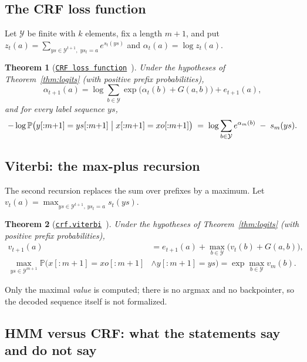 \documentclass[11pt,a4paper]{article}
\newcommand{\lmod}[2]{\href{http://www.lemma.cn/lean/?module=#2}{\nolinkurl{#1}}}
\newtheorem{theorem}{Theorem}[section]
\newcommand{\Prb}{\mathbb{P}}
\newcommand{\Y}{\mathcal{Y}}
\begin{document}
\subsection{The CRF loss function}
\label{sec:forward}
Let $\Y$ be finite with $k$ elements, fix a length $m+1$, and put $z_t(a)=\sum_{ys\in\Y^{t+1},\;ys_t=a}e^{s_t(ys)}$ and $\alpha_t(a)=\log z_t(a)$.

\begin{theorem}[\lmod{CRF loss function}{Random.All_Eq_AddLogSumExpAdd.All_EqNegLogProb.of.All_Eq_LogProbCond.All_Eq_LogProbCond.Eq_LogProbJoint.All_Lt0ProbJoint.IsDiscreteHMM}~\cite{lemma_crf_nll}]
\label{thm:nll}
Under the hypotheses of Theorem~\ref{thm:logits} (with positive prefix probabilities),
\[
\alpha_{t+1}(a)=\log\sum_{b\in\Y}\exp\bigl(\alpha_t(b)+G(a,b)\bigr)+e_{t+1}(a),
\]
and for every label sequence $ys$,
\[
-\log\Prb\bigl(y[{:}m{+}1]=ys[{:}m{+}1]\bigm|x[{:}m{+}1]=xo[{:}m{+}1]\bigr)\;=\;\log\sum_{b\in\Y}e^{\alpha_m(b)}\;-\;s_m(ys).
\]
\end{theorem}

\subsection{Viterbi: the max-plus recursion}
\label{sec:viterbi}
The second recursion replaces the sum over prefixes by a maximum.
Let $v_t(a)=\max_{ys\in\Y^{t+1},\,ys_t=a}s_t(ys)$.

\begin{theorem}[\lmod{crf.viterbi}{Random.All_Eq_Add_MaxAdd.EqMax_ProbJoint.of.All_Eq_LogProbCond.All_Eq_LogProbCond.Eq_LogProbJoint.All_Lt0ProbJoint.IsDiscreteHMM}~\cite{lemma_crf_viterbi}]
\label{thm:viterbi}
Under the hypotheses of Theorem~\ref{thm:logits} (with positive prefix probabilities),
\begin{align*}
v_{t+1}(a)&=e_{t+1}(a)+\max_{b\in\Y}\bigl(v_t(b)+G(a,b)\bigr),\\
\max_{ys\in\Y^{m+1}}\Prb\bigl(x[{:}m{+}1]=xo[{:}m{+}1]&\wedge y[{:}m{+}1]=ys\bigr)=\exp\max_{b\in\Y}v_m(b).
\end{align*}
\end{theorem}
Only the maximal \emph{value} is computed; there is no argmax and no backpointer, so the decoded sequence itself is not formalized.


\subsection{HMM versus CRF: what the statements say and do not say}
\label{sec:hmmcrf}
\end{document}

